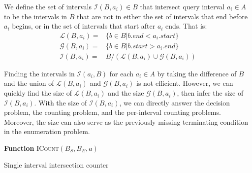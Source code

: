 \documentclass{bioinfo}
\begin{document}
	We define the set of intervals $\mathcal{I}(B,a_i) \in B$ that
	intersect query interval $a_i\in A$ to be the intervals in $B$ that
	are not in either the set of intervals that end before $a_i$ begins,
	or in the set of intervals that start after $a_i$ ends.  That is:
	\begin{equation*}
		\begin{split}
			\mathcal{L}(B,a_i) = &\{b\in B| b.end < a_i.start\} \\
			\mathcal{G}(B,a_i) = &\{b\in B| b.start > a_i.end\} \\
			\mathcal{I}(B,a_i) = &B / (\mathcal{L}(B,a_i) \cup \mathcal{G}(B,a_i))
		\end{split}
	\end{equation*}

	Finding the intervals in $\mathcal{I}(a_i,B)$ for each $a_i\in A$ by
	taking the difference of $B$ and the union of $\mathcal{L}(B,a_i)$ and
	$\mathcal{G}(B,a_i)$ is not efficient.  However, we can quickly find
	the size of $\mathcal{L}(B,a_i)$ and the size $\mathcal{G}(B,a_i)$,
	then infer the size of $\mathcal{I}(B,a_i)$.  With the size of
	$\mathcal{I}(B,a_i)$, we can directly answer the decision problem, the
	counting problem, and the per-interval counting problems.  Moreover,
	the size can also serve as the previously missing terminating
	condition in the enumeration problem.

	\begin{algorithm}[h]
		\DontPrintSemicolon
		\footnotesize
		\BlankLine
		\textbf{Function} \textsc{ICount}$(B_S,B_E,a)$
		\caption{Single interval intersection counter}
	\end{algorithm}
\end{document}

